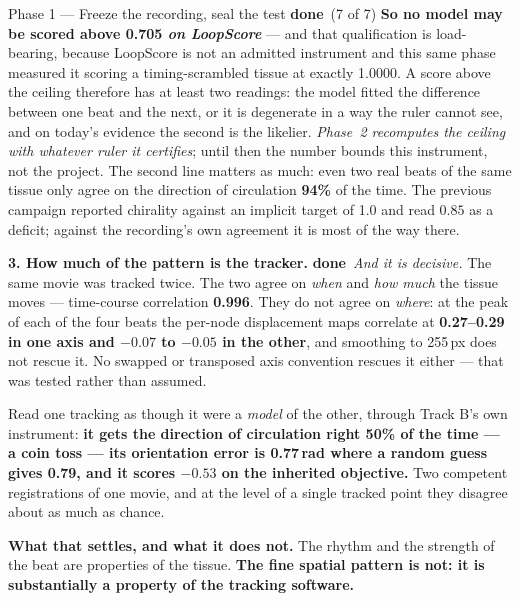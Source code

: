 \documentclass[11pt,a4paper]{article}
\newcommand{\dn}{\textcolor{good}{\textbf{done}}}
\begin{document}
\begin{phasebox}{Phase 1 --- Freeze the recording, seal the test \hfill \dn\ (7 of 7)}
\textbf{So no model may be scored above 0.705 \emph{on LoopScore}} --- and that qualification is
load-bearing, because LoopScore is not an admitted instrument and this same phase measured it
scoring a timing-scrambled tissue at exactly 1.0000. A score above the ceiling therefore has at
least two readings: the model fitted the difference between one beat and the next, or it is
degenerate in a way the ruler cannot see, and on today's evidence the second is the likelier.
\emph{Phase~2 recomputes the ceiling with whatever ruler it certifies}; until then the number
bounds this instrument, not the project. The second line matters as much: even two real beats of the same tissue
only agree on the direction of circulation \textbf{94\%} of the time. The previous campaign
reported chirality against an implicit target of 1.0 and read $0.85$ as a deficit; against the
recording's own agreement it is most of the way there.

\textbf{3. How much of the pattern is the tracker.} \dn\ \emph{And it is decisive.} The same movie
was tracked twice. The two agree on \emph{when} and \emph{how much} the tissue moves ---
time-course correlation \textbf{0.996}. They do not agree on \emph{where}: at the peak of each of
the four beats the per-node displacement maps correlate at \textbf{0.27--0.29 in one axis and
$-0.07$ to $-0.05$ in the other}, and smoothing to 255\,px does not rescue it. No swapped or
transposed axis convention rescues it either --- that was tested rather than assumed.

Read one tracking as though it were a \emph{model} of the other, through Track B's own instrument:
\textbf{it gets the direction of circulation right 50\% of the time --- a coin toss --- its
orientation error is 0.77\,rad where a random guess gives 0.79, and it scores $-0.53$ on the
inherited objective.} Two competent registrations of one movie, and at the level of a single
tracked point they disagree about as much as chance.

\textbf{What that settles, and what it does not.} The rhythm and the strength of the beat are
properties of the tissue. \textbf{The fine spatial pattern is not: it is substantially a property of
the tracking software.}


\end{phasebox}
\end{document}
